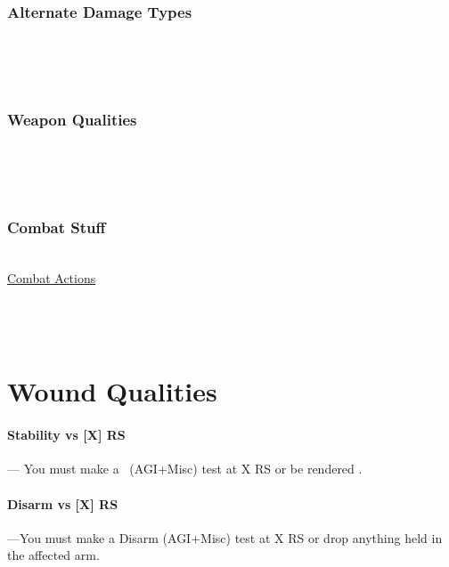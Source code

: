 \documentclass[oneside,11pt,english]{book}
\begin{document}
\subsubsection{Alternate Damage Types} \vspace{-10pt}
\\
\\
\\
\subsubsection{Weapon Qualities} \vspace{-10pt}
\\
\\
\\
\subsubsection{Combat Stuff} \vspace{-10pt}
\\
\hyperref[sec:combat-actions]{Combat Actions}\\
\\
\\
\\

\section{Wound Qualities}

\paragraph[Stability vs. ]{\label{par:Stability vs}Stability vs [X] RS}---\quad
You must make a ~(AGI+Misc) test at X RS or be rendered .

\vspace{-8pt}\paragraph[Disarm vs. ]{Disarm vs [X] RS}\label{par:Disarm vs}
---\quad You must make a Disarm (AGI+Misc) test at X RS or drop anything held in the affected arm.
\end{document}
